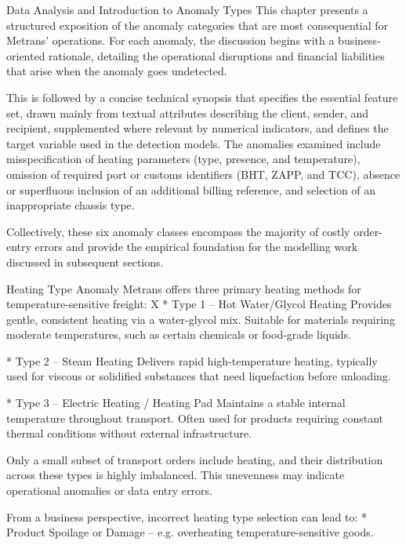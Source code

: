 \chap Data Analysis and Introduction to Anomaly Types
This chapter presents a structured exposition of the anomaly categories that are most consequential for Metrans’ operations. For each anomaly, the discussion begins with a business-oriented rationale, detailing the operational disruptions and financial liabilities that arise when the anomaly goes undetected.

This is followed by a concise technical synopsis that specifies the essential feature set, drawn mainly from textual attributes describing the client, sender, and recipient, supplemented where relevant by numerical indicators, and defines the target variable used in the detection models. The anomalies examined include misspecification of heating parameters (type, presence, and temperature), omission of required port or customs identifiers (BHT, ZAPP, and TCC), absence or superfluous inclusion of an additional billing reference, and selection of an inappropriate chassis type. 

Collectively, these six anomaly classes encompass the majority of costly order-entry errors and provide the empirical foundation for the modelling work discussed in subsequent sections.

 
\sec Heating Type Anomaly
Metrans offers three primary heating methods for temperature-sensitive freight:
\begitems \style X
 * Type 1 – Hot Water/Glycol Heating
Provides gentle, consistent heating via a water-glycol mix. Suitable for materials requiring moderate temperatures, such as certain chemicals or food-grade liquids.

* Type 2 – Steam Heating
Delivers rapid high-temperature heating, typically used for viscous or solidified substances that need liquefaction before unloading.

* Type 3 – Electric Heating / Heating Pad
Maintains a stable internal temperature throughout transport. Often used for products requiring constant thermal conditions without external infrastructure.
\enditems

Only a small subset of transport orders include heating, and their distribution across these types is highly imbalanced. This unevenness may indicate operational anomalies or data entry errors.

From a business perspective, incorrect heating type selection can lead to:
\begitems
* Product Spoilage or Damage – e.g. overheating temperature-sensitive goods.

